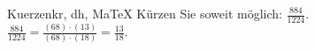 \begin{MAufgabe}{Kuerzen}{kr, dh, MaTeX}
K\"urzen Sie soweit m\"oglich: $\frac{884}{1224}$.\\ 
\ifLsg\MLoesung
\quad $\frac{884}{1224}=\frac{(68)\cdot(13)}{(68)\cdot(18)}=\frac{13}{18}$.\else\relax\fi
 \end{MAufgabe}